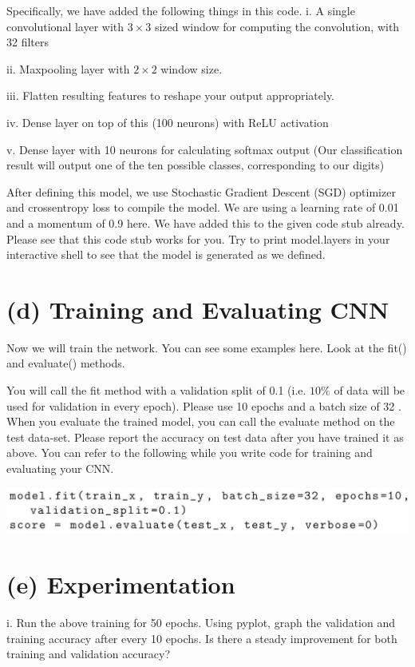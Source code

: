 \documentclass[10pt]{article}
\begin{document}
Specifically, we have added the following things in this code.
i. A single convolutional layer with $3 \times 3$ sized window for computing the convolution, with 32 filters

ii. Maxpooling layer with $2 \times 2$ window size.

iii. Flatten resulting features to reshape your output appropriately.

iv. Dense layer on top of this (100 neurons) with ReLU activation

v. Dense layer with 10 neurons for calculating softmax output (Our classification result will output one of the ten possible classes, corresponding to our digits)

After defining this model, we use Stochastic Gradient Descent (SGD) optimizer and crossentropy loss to compile the model. We are using a learning rate of 0.01 and a momentum of 0.9 here. We have added this to the given code stub already. Please see that this code stub works for you. Try to print model.layers in your interactive shell to see that the model is generated as we defined.

\section*{(d) Training and Evaluating CNN}
Now we will train the network. You can see some examples here. Look at the fit() and evaluate() methods.

You will call the fit method with a validation split of 0.1 (i.e. $10 \%$ of data will be used for validation in every epoch). Please use 10 epochs and a batch size of 32 . When you evaluate the trained model, you can call the evaluate method on the test data-set. Please report the accuracy on test data after you have trained it as above. You can refer to the following while you write code for training and evaluating your CNN.

\begin{center}
\includegraphics[max width=\textwidth]{2023_11_03_3a37fc63330e1b210712g-4}
\end{center}

\section*{(e) Experimentation}
i. Run the above training for 50 epochs. Using pyplot, graph the validation and training accuracy after every 10 epochs. Is there a steady improvement for both training and validation accuracy?
\end{document}
